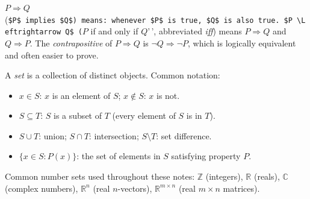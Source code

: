 \documentclass[
  letterpaper,
]{scrbook}
\newcommand{\fR}{\mathbb{R}}
\newcommand{\fC}{\mathbb{C}}
\newcommand{\fZ}{\mathbb{Z}}
\begin{document}
\begin{tcolorbox}[enhanced jigsaw, arc=.35mm, bottomrule=.15mm, bottomtitle=1mm, breakable, colback=white, colbacktitle=quarto-callout-note-color!10!white, colframe=quarto-callout-note-color-frame, coltitle=black, left=2mm, leftrule=.75mm, opacityback=0, opacitybacktitle=0.6, rightrule=.15mm, title={Definition: Implication and Equivalence}, titlerule=0mm, toprule=.15mm, toptitle=1mm]

\(P \Rightarrow Q\)
(\texttt{\$P\$\ implies\ \$Q\$\textquotesingle{}\textquotesingle{})\ means:\ whenever\ \$P\$\ is\ true,\ \$Q\$\ is\ also\ true.\ \$P\ \textbackslash{}Leftrightarrow\ Q\$\ (}\(P\)
if and only if \(Q\)'\,', abbreviated \emph{iff}) means
\(P \Rightarrow Q\) and \(Q \Rightarrow P\). The \emph{contrapositive}
of \(P \Rightarrow Q\) is \(\neg Q \Rightarrow \neg P\), which is
logically equivalent and often easier to prove.

\end{tcolorbox}

\begin{tcolorbox}[enhanced jigsaw, arc=.35mm, bottomrule=.15mm, bottomtitle=1mm, breakable, colback=white, colbacktitle=quarto-callout-note-color!10!white, colframe=quarto-callout-note-color-frame, coltitle=black, left=2mm, leftrule=.75mm, opacityback=0, opacitybacktitle=0.6, rightrule=.15mm, title={Definition: Set Notation}, titlerule=0mm, toprule=.15mm, toptitle=1mm]

A \emph{set} is a collection of distinct objects. Common notation:

\begin{itemize}
\item
  \(x \in S\): \(x\) is an element of \(S\); \quad \(x \notin S\): \(x\)
  is not.
\item
  \(S \subseteq T\): \(S\) is a subset of \(T\) (every element of \(S\)
  is in \(T\)).
\item
  \(S \cup T\): union; \quad \(S \cap T\): intersection;
  \quad \(S \setminus T\): set difference.
\item
  \(\{x \in S : P(x)\}\): the set of elements in \(S\) satisfying
  property \(P\).
\end{itemize}

Common number sets used throughout these notes: \(\fZ\) (integers),
\(\fR\) (reals), \(\fC\) (complex numbers), \(\fR^n\) (real
\(n\)-vectors), \(\fR^{m \times n}\) (real \(m \times n\) matrices).

\end{tcolorbox}
\end{document}
